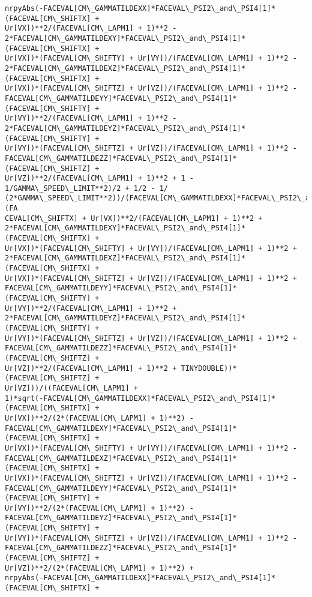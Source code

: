 \documentclass[landscape,letterpaper,10pt,english]{article}
\begin{document}
\begin{Verbatim}[commandchars=\\\{\}]
nrpyAbs(-FACEVAL[CM\_GAMMATILDEXX]*FACEVAL\_PSI2\_and\_PSI4[1]*(FACEVAL[CM\_SHIFTX] +
Ur[VX])**2/(FACEVAL[CM\_LAPM1] + 1)**2 -
2*FACEVAL[CM\_GAMMATILDEXY]*FACEVAL\_PSI2\_and\_PSI4[1]*(FACEVAL[CM\_SHIFTX] +
Ur[VX])*(FACEVAL[CM\_SHIFTY] + Ur[VY])/(FACEVAL[CM\_LAPM1] + 1)**2 -
2*FACEVAL[CM\_GAMMATILDEXZ]*FACEVAL\_PSI2\_and\_PSI4[1]*(FACEVAL[CM\_SHIFTX] +
Ur[VX])*(FACEVAL[CM\_SHIFTZ] + Ur[VZ])/(FACEVAL[CM\_LAPM1] + 1)**2 -
FACEVAL[CM\_GAMMATILDEYY]*FACEVAL\_PSI2\_and\_PSI4[1]*(FACEVAL[CM\_SHIFTY] +
Ur[VY])**2/(FACEVAL[CM\_LAPM1] + 1)**2 -
2*FACEVAL[CM\_GAMMATILDEYZ]*FACEVAL\_PSI2\_and\_PSI4[1]*(FACEVAL[CM\_SHIFTY] +
Ur[VY])*(FACEVAL[CM\_SHIFTZ] + Ur[VZ])/(FACEVAL[CM\_LAPM1] + 1)**2 -
FACEVAL[CM\_GAMMATILDEZZ]*FACEVAL\_PSI2\_and\_PSI4[1]*(FACEVAL[CM\_SHIFTZ] +
Ur[VZ])**2/(FACEVAL[CM\_LAPM1] + 1)**2 + 1 - 1/GAMMA\_SPEED\_LIMIT**2)/2 + 1/2 - 1/
(2*GAMMA\_SPEED\_LIMIT**2))/(FACEVAL[CM\_GAMMATILDEXX]*FACEVAL\_PSI2\_and\_PSI4[1]*(FA
CEVAL[CM\_SHIFTX] + Ur[VX])**2/(FACEVAL[CM\_LAPM1] + 1)**2 +
2*FACEVAL[CM\_GAMMATILDEXY]*FACEVAL\_PSI2\_and\_PSI4[1]*(FACEVAL[CM\_SHIFTX] +
Ur[VX])*(FACEVAL[CM\_SHIFTY] + Ur[VY])/(FACEVAL[CM\_LAPM1] + 1)**2 +
2*FACEVAL[CM\_GAMMATILDEXZ]*FACEVAL\_PSI2\_and\_PSI4[1]*(FACEVAL[CM\_SHIFTX] +
Ur[VX])*(FACEVAL[CM\_SHIFTZ] + Ur[VZ])/(FACEVAL[CM\_LAPM1] + 1)**2 +
FACEVAL[CM\_GAMMATILDEYY]*FACEVAL\_PSI2\_and\_PSI4[1]*(FACEVAL[CM\_SHIFTY] +
Ur[VY])**2/(FACEVAL[CM\_LAPM1] + 1)**2 +
2*FACEVAL[CM\_GAMMATILDEYZ]*FACEVAL\_PSI2\_and\_PSI4[1]*(FACEVAL[CM\_SHIFTY] +
Ur[VY])*(FACEVAL[CM\_SHIFTZ] + Ur[VZ])/(FACEVAL[CM\_LAPM1] + 1)**2 +
FACEVAL[CM\_GAMMATILDEZZ]*FACEVAL\_PSI2\_and\_PSI4[1]*(FACEVAL[CM\_SHIFTZ] +
Ur[VZ])**2/(FACEVAL[CM\_LAPM1] + 1)**2 + TINYDOUBLE))*(FACEVAL[CM\_SHIFTZ] +
Ur[VZ]))/((FACEVAL[CM\_LAPM1] +
1)*sqrt(-FACEVAL[CM\_GAMMATILDEXX]*FACEVAL\_PSI2\_and\_PSI4[1]*(FACEVAL[CM\_SHIFTX] +
Ur[VX])**2/(2*(FACEVAL[CM\_LAPM1] + 1)**2) -
FACEVAL[CM\_GAMMATILDEXY]*FACEVAL\_PSI2\_and\_PSI4[1]*(FACEVAL[CM\_SHIFTX] +
Ur[VX])*(FACEVAL[CM\_SHIFTY] + Ur[VY])/(FACEVAL[CM\_LAPM1] + 1)**2 -
FACEVAL[CM\_GAMMATILDEXZ]*FACEVAL\_PSI2\_and\_PSI4[1]*(FACEVAL[CM\_SHIFTX] +
Ur[VX])*(FACEVAL[CM\_SHIFTZ] + Ur[VZ])/(FACEVAL[CM\_LAPM1] + 1)**2 -
FACEVAL[CM\_GAMMATILDEYY]*FACEVAL\_PSI2\_and\_PSI4[1]*(FACEVAL[CM\_SHIFTY] +
Ur[VY])**2/(2*(FACEVAL[CM\_LAPM1] + 1)**2) -
FACEVAL[CM\_GAMMATILDEYZ]*FACEVAL\_PSI2\_and\_PSI4[1]*(FACEVAL[CM\_SHIFTY] +
Ur[VY])*(FACEVAL[CM\_SHIFTZ] + Ur[VZ])/(FACEVAL[CM\_LAPM1] + 1)**2 -
FACEVAL[CM\_GAMMATILDEZZ]*FACEVAL\_PSI2\_and\_PSI4[1]*(FACEVAL[CM\_SHIFTZ] +
Ur[VZ])**2/(2*(FACEVAL[CM\_LAPM1] + 1)**2) +
nrpyAbs(-FACEVAL[CM\_GAMMATILDEXX]*FACEVAL\_PSI2\_and\_PSI4[1]*(FACEVAL[CM\_SHIFTX] +

\end{Verbatim}
\end{document}
